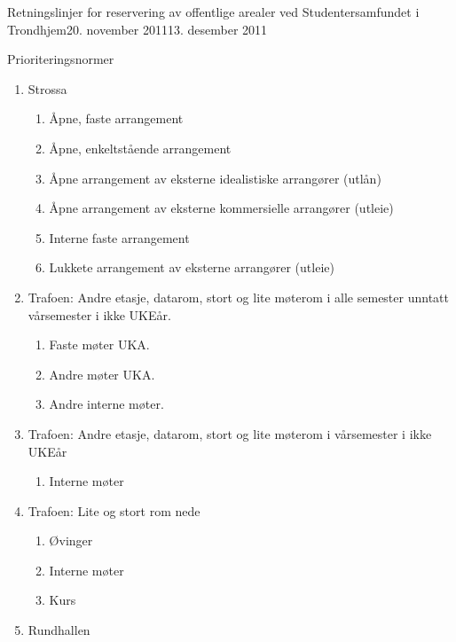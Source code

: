 \documentclass[fsbok.tex]{subfiles}
\begin{document}
\begin{instruks}{Retningslinjer for reservering av offentlige arealer
    ved Studentersamfundet i Trondhjem}{20. november 2011}{13. desember 2011}
\begin{instruksledd}{Prioriteringsnormer}
\begin{enumerate}
\begin{enumerate}
\begin{enumerate}
                        \end{enumerate}
                        5 For eksempel stikkefest.
                    \item Strossa
                        \begin{enumerate}
                            \item  Åpne, faste arrangement
                            \item Åpne, enkeltstående arrangement
                            \item Åpne arrangement av eksterne idealistiske arrangører
                                (utlån)
                            \item Åpne arrangement av eksterne kommersielle arrangører
                                (utleie)
                            \item Interne faste arrangement
                            \item Lukkete arrangement av eksterne arrangører (utleie)
                        \end{enumerate}
		    \item Trafoen: Andre etasje, datarom, stort og lite møterom i alle semester unntatt vårsemester i ikke UKEår.
			\begin{enumerate}
			    \item Faste møter UKA.
			    \item Andre møter UKA.
			    \item Andre interne møter.		
			\end{enumerate}	
		    \item Trafoen: Andre etasje, datarom, stort og lite møterom i vårsemester i ikke UKEår
			\begin{enumerate}
			    \item Interne møter
			\end{enumerate}	
                    \item Trafoen: Lite og stort rom nede
                        \begin{enumerate}
                            \item Øvinger
                            \item Interne møter
                            \item Kurs
                        \end{enumerate}
                    \item Rundhallen
                        \begin{enumerate}

\end{enumerate}
\end{enumerate}
\end{enumerate}
\end{instruksledd}
\end{instruks}
\end{document}

